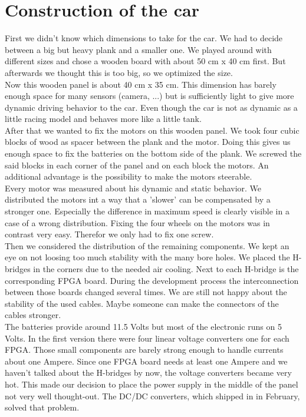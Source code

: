 \clearpage
\section{Construction of the car}

First we didn't know which dimensions to take for the car. We had to decide between a big but heavy plank and a smaller one. We played around with different sizes and chose a wooden board with about 50 cm x 40 cm first. But afterwards we thought this is too big, so we optimized the size.\\
Now this wooden panel is about 40 cm x 35 cm. This dimension has barely enough space for many sensors (camera, ...) but is sufficiently light to give more dynamic driving behavior to the car. Even though the car is not as dynamic as a little racing model and behaves more like a little tank.\\

After that we wanted to fix the motors on this wooden panel. We took four cubic blocks of wood as spacer between the plank and the motor. Doing this gives us enough space to fix the batteries on the bottom side of the plank. We screwed the said blocks in each corner of the panel and on each block the motors. An additional advantage is the possibility to make the motors steerable.\\

Every motor was measured about his dynamic and static behavior. We distributed the motors int a way that a 'slower' can be compensated by a stronger one. Especially the difference in maximum speed is clearly visible in a case of a wrong distribution. Fixing the four wheels on the motors was in contrast very easy. Therefor we only had to fix one screw.\\

Then we considered the distribution of the remaining components. We kept an eye on not loosing too much stability with the many bore holes. We placed the H-bridges in the corners due to the needed air cooling. Next to each H-bridge is the corresponding FPGA board. During the development process the interconnection between those boards changed several times. We are still not happy about the stability of the used cables. Maybe someone can make the connectors of the cables stronger.\\

The batteries provide around 11.5 Volts but most of the electronic runs on 5 Volts. In the first version there were four linear voltage converters one for each FPGA. Those small components are barely strong enough to handle currents about one Ampere. Since one FPGA board needs at least one Ampere and we haven't talked about the H-bridges by now, the voltage converters became very hot. This made our decision to place the power supply in the middle of the panel not very well thought-out. The DC/DC converters, which shipped in in February, solved that problem.\\

